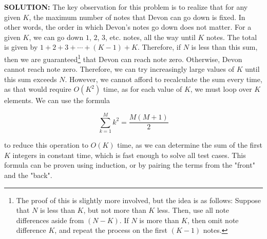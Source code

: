 \textbf{SOLUTION:}
\blank
The key observation for this problem is to realize that for any given $ K $, the maximum number of notes that Devon can go down is fixed.  In other words, the order in which Devon's notes go down does not matter.  For a given $ K $, we can go down $ 1 $, $ 2 $, $ 3 $, etc. notes, all the way until $ K $ notes.  The total is given by $ 1 + 2 + 3 + \cdots + (K-1) + K $.  Therefore, if $ N $ is less than this sum, then we are guaranteed\footnote{The proof of this is slightly more involved, but the idea is as follows: Suppose that $ N $ is less than $ K $, but not more than $ K $ less.  Then, use all note differences aside from $ (N-K) $.  If $ N $ is more than $ K $, then omit note difference $ K $, and repeat the process on the first $ (K-1) $ notes.} that Devon can reach note zero.  Otherwise, Devon cannot reach note zero.  Therefore, we can try increasingly large values of $ K $ until this sum exceeds $ N $.  However, we cannot afford to recalculate the sum every time, as that would require $ O(K^2) $ time, as for each value of $ K $, we must loop over $ K $ elements.
\blank
We can use the formula

$$ \sum_{k=1}^{M} k^2 = \frac{M(M+1)}{2} $$

to reduce this operation to $ O(K) $ time, as we can determine the sum of the first $ K $ integers in constant time, which is fast enough to solve all test cases.  This formula can be proven using induction, or by pairing the terms from the "front" and the "back".